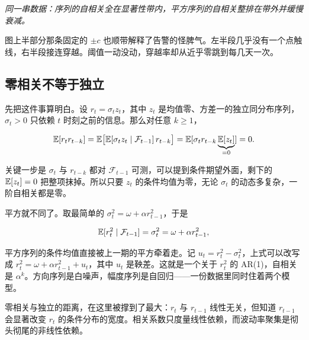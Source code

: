 \begin{center}
\end{center}

\emph{同一串数据：序列的自相关全在显著性带内，平方序列的自相关整排在带外并缓慢衰减。}

图上半部分那条固定的 \(\pm c\) 也顺带解释了告警的怪脾气。左半段几乎没有一个点触线，右半段接连穿越。阈值一动没动，穿越率却从近乎零跳到每几天一次。

\subsection{零相关不等于独立}

先把这件事算明白。设 \(r_t=\sigma_t z_t\)，其中 \(z_t\) 是均值零、方差一的独立同分布序列，\(\sigma_t>0\) 只依赖 \(t\) 时刻之前的信息。那么对任意 \(k\ge 1\)，

\[
\mathbb{E}[r_tr_{t-k}]
=\mathbb{E}\big[\mathbb{E}[\sigma_tz_t\mid\mathcal F_{t-1}]\,r_{t-k}\big]
=\mathbb{E}[\sigma_tr_{t-k}\underbrace{\mathbb{E}[z_t]}_{=0}]
=0 .
\]

关键一步是 \(\sigma_t\) 与 \(r_{t-k}\) 都对 \(\mathcal F_{t-1}\) 可测，可以提到条件期望外面，剩下的 \(\mathbb{E}[z_t]=0\) 把整项抹掉。所以只要 \(z_t\) 的条件均值为零，无论 \(\sigma_t\) 的动态多复杂，一阶自相关都是零。

平方就不同了。取最简单的 \(\sigma_t^2=\omega+\alpha r_{t-1}^2\)，于是

\[
\mathbb{E}[r_t^2\mid\mathcal F_{t-1}]=\sigma_t^2=\omega+\alpha r_{t-1}^2 ,
\]

平方序列的条件均值直接被上一期的平方牵着走。记 \(u_t=r_t^2-\sigma_t^2\)，上式可以改写成 \(r_t^2=\omega+\alpha r_{t-1}^2+u_t\)，其中 \(u_t\) 是鞅差。这就是一个关于 \(r_t^2\) 的 AR(1)，自相关是 \(\alpha^k\)。方向序列是白噪声，幅度序列是自回归——一份数据里同时住着两个模型。

零相关与独立的距离，在这里被撑到了最大：\(r_t\) 与 \(r_{t-1}\) 线性无关，但知道 \(r_{t-1}\) 会显著改变 \(r_t\) 的条件分布的宽度。相关系数只度量线性依赖，而波动率聚集是彻头彻尾的非线性依赖。

